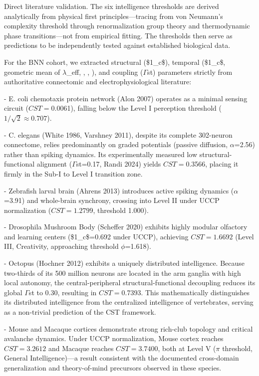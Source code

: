 \documentclass[a4paper,12pt]{article}
\begin{document}
Direct literature validation. The six intelligence thresholds are derived analytically from physical first principles---tracing from von Neumann's complexity threshold through renormalization group theory and thermodynamic phase transitions---not from empirical fitting. The thresholds then serve as predictions to be independently tested against established biological data.


For the BNN cohort, we extracted structural (\$1_{c}\$), temporal (\$1_{c}\$, geometric mean of $\lambda$_eff, \Phi, \Psi, \Theta), and coupling ($\Gamma$st) parameters strictly from authoritative connectomic and electrophysiological literature:


- E. coli chemotaxis protein network (Alon 2007) operates as a minimal sensing circuit ($CST = $0.0061), falling below the Level I perception threshold ($1/\sqrt{2} \approx 0.707$).


- C. elegans (White 1986, Varshney 2011), despite its complete 302-neuron connectome, relies predominantly on graded potentials (passive diffusion, $\alpha$=2.56) rather than spiking dynamics. Its experimentally measured low structural-functional alignment ($\Gamma$st=0.17, Randi 2024) yields $CST = $0.3566, placing it firmly in the Sub-I to Level I transition zone.


- Zebrafish larval brain (Ahrens 2013) introduces active spiking dynamics ($\alpha$=3.91) and whole-brain synchrony, crossing into Level II under UCCP normalization ($CST = 1.2799$, threshold 1.000).


- Drosophila Mushroom Body (Scheffer 2020) exhibits highly modular olfactory and learning centers (\$1_{c}\$=0.692 under UCCP), achieving $CST = 1.6692$ (Level III, Creativity, approaching threshold $\phi$=1.618).


- Octopus (Hochner 2012) exhibits a uniquely distributed intelligence. Because two-thirds of its 500 million neurons are located in the arm ganglia with high local autonomy, the central-peripheral structural-functional decoupling reduces its global $\Gamma$st to 0.30, resulting in $CST = $0.7393. This mathematically distinguishes its distributed intelligence from the centralized intelligence of vertebrates, serving as a non-trivial prediction of the CST framework.


- Mouse and Macaque cortices demonstrate strong rich-club topology and critical avalanche dynamics. Under UCCP normalization, Mouse cortex reaches $CST = 3.2612$ and Macaque reaches $CST = 3.7400$, both at Level V ($\pi$ threshold, General Intelligence)---a result consistent with the documented cross-domain generalization and theory-of-mind precursors observed in these species.
\end{document}
